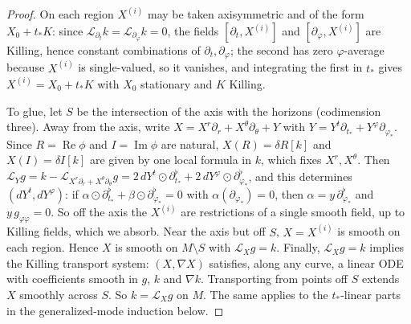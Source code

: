 \documentclass[11pt]{amsart}
\theoremstyle{definition}
\theoremstyle{remark}
\numberwithin{equation}{section}
\newcommand{\cL}{\mathcal{L}}
\renewcommand{\Im}{\operatorname{Im}}
\renewcommand{\Re}{\operatorname{Re}}
\begin{document}
\begin{proof}
On each region $X^{(i)}$ may be taken axisymmetric and of the form $X_0+t_*K$: since $\cL_{\partial_t}k=\cL_{\partial_\varphi}k=0$,
the fields $[\partial_t,X^{(i)}]$ and $[\partial_\varphi,X^{(i)}]$ are Killing, hence constant combinations of $\partial_t,\partial_\varphi$;
the second has zero $\varphi$-average because $X^{(i)}$ is single-valued, so it vanishes, and integrating the first in
$t_*$ gives $X^{(i)}=X_0+t_*K$ with $X_0$ stationary and $K$ Killing.

To glue, let $S$ be the intersection of the axis with the horizons (codimension three). Away from the axis, write
$X=X^r\partial_r+X^\theta\partial_\theta+Y$ with $Y=Y^t\partial_{t_*}+Y^\varphi\partial_{\varphi_*}$. Since $R=\Re\phi$ and
$I=\Im\phi$ are natural, $X(R)=\delta R[k]$ and $X(I)=\delta I[k]$ are given by one local formula in $k$, which fixes
$X^r,X^\theta$. Then $\cL_Yg=k-\cL_{X^r\partial_r+X^\theta\partial_\theta}g=2\,dY^t\odot\partial_{t_*}^\flat+2\,dY^\varphi\odot\partial_{\varphi_*}^\flat$,
and this determines $(dY^t,dY^\varphi)$: if $\alpha\odot\partial_{t_*}^\flat+\beta\odot\partial_{\varphi_*}^\flat=0$ with
$\alpha(\partial_{\varphi_*})=0$, then $\alpha=y\,\partial_{\varphi_*}^\flat$ and $y\,g_{\varphi\varphi}=0$. So off the axis the
$X^{(i)}$ are restrictions of a single smooth field, up to Killing fields, which we absorb. Near the axis but off $S$,
$X=X^{(i)}$ is smooth on each region. Hence $X$ is smooth on $M\setminus S$ with $\cL_Xg=k$. Finally, $\cL_Xg=k$ implies
the Killing transport system: $(X,\nabla X)$ satisfies, along any curve, a linear ODE with coefficients smooth in $g$,
$k$ and $\nabla k$. Transporting from points off $S$ extends $X$ smoothly across $S$. So $k=\cL_Xg$ on $M$. The same applies to the
$t_*$-linear parts in the generalized-mode induction below.
\end{proof}
\end{document}
